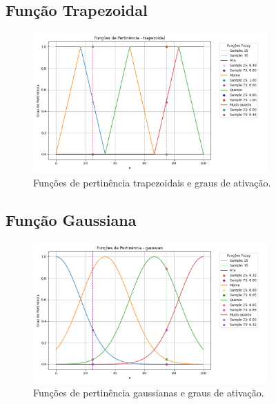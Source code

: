 \documentclass[a4paper,12pt]{article}
\begin{document}
\subsection{Função Trapezoidal}
\begin{figure}[H]
    \centering
    \includegraphics[width=0.8\textwidth]{img/funções_de_pertinência_trapezoidal_fuzzificado.png}
    \caption{Funções de pertinência trapezoidais e graus de ativação.}
\end{figure}

\subsection{Função Gaussiana}
\begin{figure}[H]
    \centering
    \includegraphics[width=0.8\textwidth]{img/funções_de_pertinência_gaussian_fuzzificado.png}
    \caption{Funções de pertinência gaussianas e graus de ativação.}
\end{figure}
\end{document}
